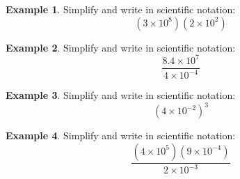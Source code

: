 \documentclass[addpoints,12pt]{exam}
\theoremstyle{definition}
\theoremstyle{break}
\theoremstyle{break}
\newtheorem{example}{Example}[subsection]
\begin{document}
\newpage

\begin{example}
Simplify and write in scientific notation: 
\[(3\times 10^8)(2\times 10^2)\]
\vspace{.75in}
\end{example}

\begin{example}
Simplify and write in scientific notation: 
\[\dfrac{8.4\times 10^7}{4\times 10^{-4}}\]
\vspace{.75in}
\end{example}

\begin{example}
Simplify and write in scientific notation: 
\[(4\times 10^{-2})^3\]
\vspace{.75in}
\end{example}

\begin{example}
Simplify and write in scientific notation: 
\[\dfrac{(4\times 10^5)(9\times 10^{-4})}{2\times 10^{-3}}\]
\end{example}
\end{document}

